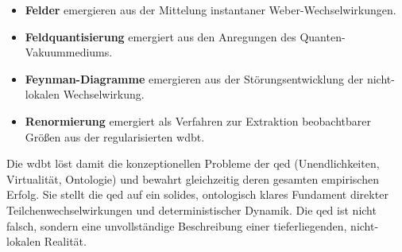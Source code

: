 \begin{itemize}
    \item \textbf{Felder} emergieren aus der Mittelung instantaner Weber-Wechselwirkungen.
    \item \textbf{Feldquantisierung} emergiert aus den Anregungen des Quanten-Vakuummediums.
    \item \textbf{Feynman-Diagramme} emergieren aus der Störungsentwicklung der nicht-lokalen Wechselwirkung.
    \item \textbf{Renormierung} emergiert als Verfahren zur Extraktion beobachtbarer Größen aus der regularisierten \gls{wdbt}.
\end{itemize}

Die \gls{wdbt} löst damit die konzeptionellen Probleme der \gls{qed} (Unendlichkeiten, Virtualität, Ontologie) und bewahrt gleichzeitig deren gesamten empirischen Erfolg. Sie stellt die \gls{qed} auf
ein solides, ontologisch klares Fundament direkter Teilchenwechselwirkungen und deterministischer Dynamik. Die \gls{qed} ist nicht falsch, sondern eine unvollständige Beschreibung einer tieferliegenden,
nicht-lokalen Realität.
